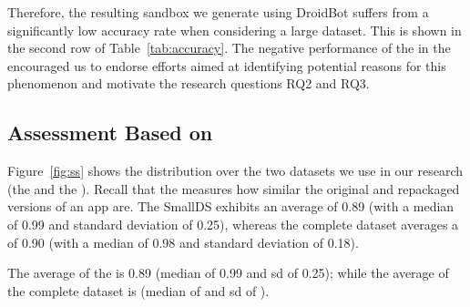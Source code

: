 



Therefore, the resulting sandbox we generate using
DroidBot suffers from a significantly low accuracy rate when considering a large dataset.
This is shown in the second row of Table~\ref{tab:accuracy}.
The negative performance of the \mas in the \cds encouraged us to endorse efforts aimed at identifying potential reasons for
this phenomenon and motivate the research questions RQ2 and RQ3.



\subsection{Assessment Based on \sscore}

Figure~\ref{fig:ss} shows the \sscore distribution
over the two datasets we use in our research
(the \sds and the \cds).
Recall that the \sscore measures how similar the
original and repackaged versions of an app are.
The SmallDS exhibits an average \sscore of 0.89 (with a median of 0.99 and standard deviation of 0.25),
whereas the complete dataset averages a \sscore of 0.90 (with a median of 0.98 and standard deviation of 0.18). 

The average \sscore of the
\sds is 0.89 (median of 0.99 and sd of 0.25); while
the average \sscore of the complete dataset is
 (median of  and sd of ).



